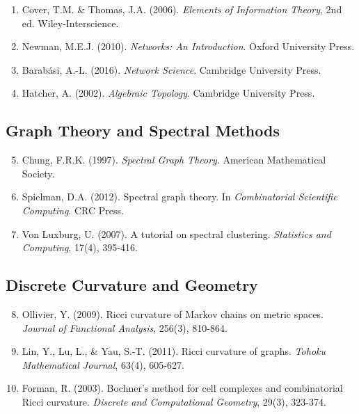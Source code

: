 \documentclass[12pt,a4paper]{article}
\theoremstyle{definition}
\theoremstyle{remark}
\begin{document}
\begin{enumerate}
    \item Cover, T.M. \& Thomas, J.A. (2006). \textit{Elements of Information Theory}, 2nd ed. Wiley-Interscience.
    
    \item Newman, M.E.J. (2010). \textit{Networks: An Introduction}. Oxford University Press.
    
    \item Barabási, A.-L. (2016). \textit{Network Science}. Cambridge University Press.
    
    \item Hatcher, A. (2002). \textit{Algebraic Topology}. Cambridge University Press.
\end{enumerate}

\subsection*{Graph Theory and Spectral Methods}

\begin{enumerate}
    \setcounter{enumi}{4}
    \item Chung, F.R.K. (1997). \textit{Spectral Graph Theory}. American Mathematical Society.
    
    \item Spielman, D.A. (2012). Spectral graph theory. In \textit{Combinatorial Scientific Computing}. CRC Press.
    
    \item Von Luxburg, U. (2007). A tutorial on spectral clustering. \textit{Statistics and Computing}, 17(4), 395-416.
\end{enumerate}

\subsection*{Discrete Curvature and Geometry}

\begin{enumerate}
    \setcounter{enumi}{7}
    \item Ollivier, Y. (2009). Ricci curvature of Markov chains on metric spaces. \textit{Journal of Functional Analysis}, 256(3), 810-864.
    
    \item Lin, Y., Lu, L., \& Yau, S.-T. (2011). Ricci curvature of graphs. \textit{Tohoku Mathematical Journal}, 63(4), 605-627.
    
    \item Forman, R. (2003). Bochner's method for cell complexes and combinatorial Ricci curvature. \textit{Discrete and Computational Geometry}, 29(3), 323-374.
\end{enumerate}
\end{document}
